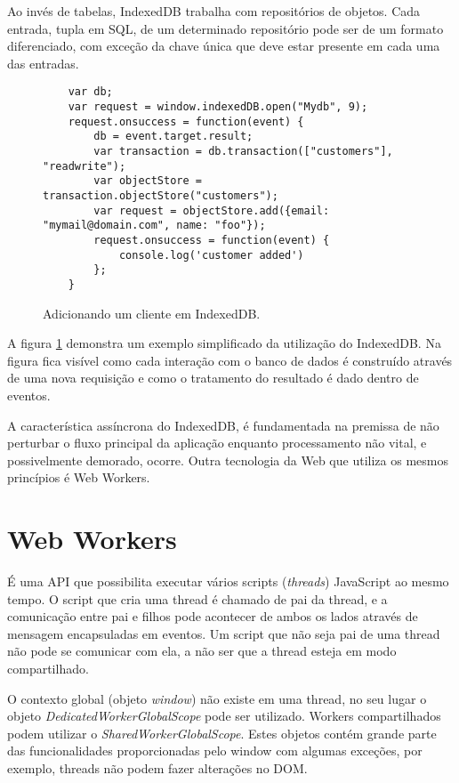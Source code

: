 Ao invés de tabelas, IndexedDB trabalha com repositórios de objetos.
Cada entrada, tupla em SQL, de um determinado repositório pode ser de
um formato diferenciado, com exceção da chave única que deve estar
presente em cada uma das entradas.

\begin{figure}[H]
\centering
\begin{verbatim}
	var db;
	var request = window.indexedDB.open("Mydb", 9);
	request.onsuccess = function(event) {
		db = event.target.result;
		var transaction = db.transaction(["customers"], "readwrite");
		var objectStore = transaction.objectStore("customers");
		var request = objectStore.add({email: "mymail@domain.com", name: "foo"});
		request.onsuccess = function(event) {
			console.log('customer added')
		};
	}
\end{verbatim}
\caption{Adicionando um cliente em IndexedDB.}
\label{fig:IndexedDB}
\end{figure}

A figura \ref{fig:IndexedDB} demonstra um exemplo simplificado da
utilização do IndexedDB. Na figura fica visível como cada interação
com o banco de dados é construído através de uma nova requisição e
como o tratamento do resultado é dado dentro de eventos.


A característica assíncrona do IndexedDB, é fundamentada na
premissa de não perturbar o fluxo principal da aplicação enquanto
processamento não vital, e possivelmente demorado, ocorre. Outra
tecnologia da Web que utiliza os mesmos princípios é Web Workers.

\section{Web Workers}

É uma API que possibilita executar vários scripts
(\textit{threads}) JavaScript ao mesmo tempo. O script que cria uma
thread é chamado de pai da thread, e a comunicação entre pai e filhos
pode acontecer de ambos os lados através de mensagem encapsuladas
em eventos. Um script que não seja pai de uma thread não pode se
comunicar com ela, a não ser que a thread esteja em modo compartilhado.

O contexto global (objeto \textit{window}) não existe em uma
thread, no seu lugar o objeto \textit{DedicatedWorkerGlobalScope}
pode ser utilizado. Workers compartilhados podem utilizar o
\textit{SharedWorkerGlobalScope}. Estes objetos contém grande parte das
funcionalidades proporcionadas pelo window com algumas exceções, por
exemplo, threads não podem fazer alterações no DOM.

